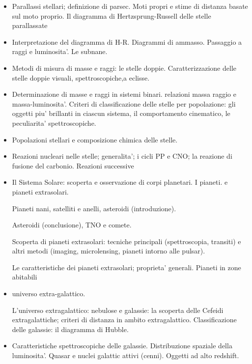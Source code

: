 \begin{itemize}
\item Parallassi stellari; definizione di parsec. Moti propri e stime di distanza basate sul moto proprio. Il diagramma di Hertzsprung-Russell delle stelle parallassate 

\item Interpretazione del diagramma di H-R. Diagrammi di ammasso. Passaggio a raggi e luminosita'. Le subnane.

\item Metodi di misura di masse e raggi: le stelle doppie. Caratterizzazione delle stelle doppie visuali, spettroscopiche,a eclisse. 

\item Determinazione di masse e raggi in sistemi binari. relazioni massa raggio e massa-luminosita'. Criteri di classificazione delle stelle per popolazione: gli oggetti piu' brillanti in ciascun sistema, il comportamento cinematico, le peculiarita' spettroscopiche. 

\item Popolazioni stellari e composizione chimica delle stelle. 

\item Reazioni nucleari nelle stelle; generalita'; i cicli PP e CNO; la reazione di fusione del carbonio. Reazioni successive 

\item Il Sistema Solare: scoperta e osservazione di corpi planetari. I pianeti. e pianeti extrasolari.

Pianeti nani, satelliti e anelli, asteroidi (introduzione). 

Asteroidi (conclusione), TNO e comete.

Scoperta di pianeti extrasolari: tecniche principali (spettroscopia, transiti) e altri metodi (imaging, microlensing, pianeti intorno alle pulsar).

Le caratteristiche dei pianeti extrasolari; proprieta' generali. Pianeti in zone abitabili 

\item universo extra-galattico.

L'universo extragalattico: nebulose e galassie: la scoperta delle Cefeidi extragalattiche; criteri di distanza in ambito extragalattico. Classificazione delle galassie: il diagramma di Hubble.

\item Caratteristiche spettroscopiche delle galassie. Distribuzione spaziale della luminosita'. Quasar e nuclei galattic attivi (cenni). Oggetti ad alto redshift.


\end{itemize}
